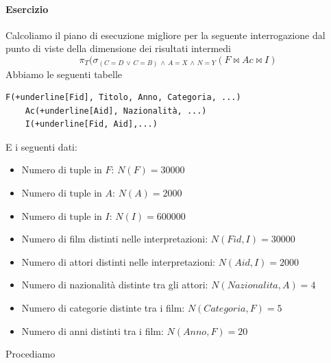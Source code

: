 \paragraph{Esercizio} Calcoliamo il piano di esecuzione migliore per la seguente interrogazione dal punto di viste della dimensione dei risultati intermedi
\[\pi_T(\sigma_{(C=D\,\lor\,C=B) \,\land \,A=X \,\land \,N=Y}(F \Join Ac \Join I)\]
Abbiamo le seguenti tabelle
\begin{Verbatim}[commandchars=+\[\]]
	F(+underline[Fid], Titolo, Anno, Categoria, ...)
	Ac(+underline[Aid], Nazionalità, ...)
	I(+underline[Fid, Aid],...)
\end{Verbatim}
E i seguenti dati:
\begin{itemize}
	\item Numero di tuple in $F$: $N(F)=30000$
	\item Numero di tuple in $A$: $N(A)=2000$
	\item Numero di tuple in $I$: $N(I)=600000$
	\item Numero di film distinti nelle interpretazioni: $N(Fid, I)=30000$
	\item Numero di attori distinti nelle interpretazioni: $N(Aid, I)=2000$
	\item Numero di nazionalità distinte tra gli attori: $N(Nazionalita, A)=4$
	\item Numero di categorie distinte tra i film: $N(Categoria, F)=5$
	\item Numero di anni distinti tra i film: $N(Anno, F)=20$
\end{itemize}
Procediamo
